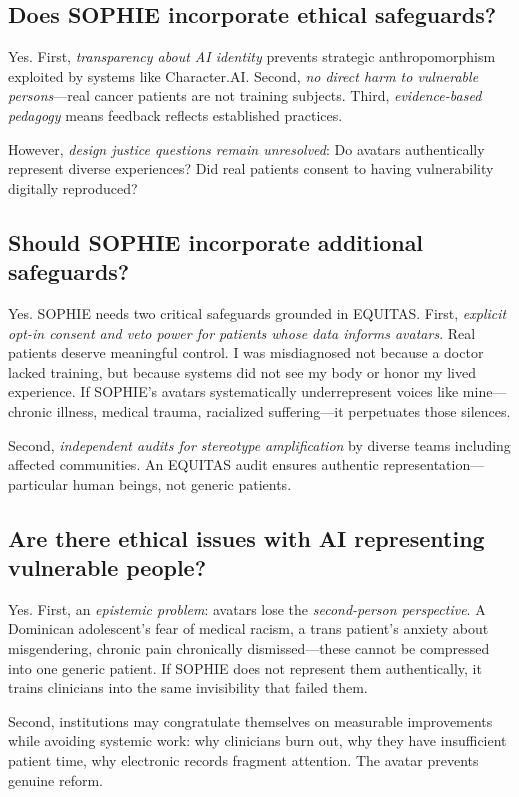 \documentclass[12pt,twoside]{article}
\begin{document}
\subsection*{Does SOPHIE incorporate ethical safeguards?}

Yes. First, \emph{transparency about AI identity} prevents strategic anthropomorphism exploited by systems like Character.AI. Second, \emph{no direct harm to vulnerable persons}—real cancer patients are not training subjects. Third, \emph{evidence-based pedagogy} means feedback reflects established practices.

However, \emph{design justice questions remain unresolved}: Do avatars authentically represent diverse experiences? Did real patients consent to having vulnerability digitally reproduced?

\subsection*{Should SOPHIE incorporate additional safeguards?}

Yes. SOPHIE needs two critical safeguards grounded in EQUITAS. First, \emph{explicit opt-in consent and veto power for patients whose data informs avatars}. Real patients deserve meaningful control. I was misdiagnosed not because a doctor lacked training, but because systems did not see my body or honor my lived experience. If SOPHIE's avatars systematically underrepresent voices like mine—chronic illness, medical trauma, racialized suffering—it perpetuates those silences.

Second, \emph{independent audits for stereotype amplification} by diverse teams including affected communities. An EQUITAS audit ensures authentic representation—particular human beings, not generic patients.

\subsection*{Are there ethical issues with AI representing vulnerable people?}

Yes. First, an \emph{epistemic problem}: avatars lose the \emph{second-person perspective}. A Dominican adolescent's fear of medical racism, a trans patient's anxiety about misgendering, chronic pain chronically dismissed—these cannot be compressed into one generic patient. If SOPHIE does not represent them authentically, it trains clinicians into the same invisibility that failed them.

Second, institutions may congratulate themselves on measurable improvements while avoiding systemic work: why clinicians burn out, why they have insufficient patient time, why electronic records fragment attention. The avatar prevents genuine reform.
\end{document}
